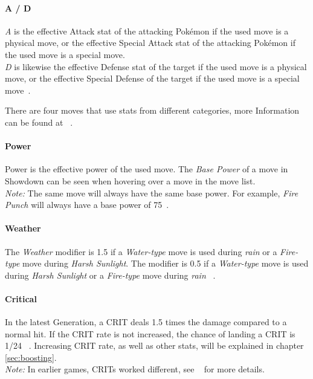 \paragraph{A / D}
\textit{A} is the effective Attack stat of the attacking Pokémon if the used move is a physical move,
or the effective Special Attack stat of the attacking Pokémon if the used move is a special move.
\\
\textit{D} is likewise the effective Defense stat of the target if the used move is a physical move,
or the effective Special Defense of the target if the used move is a special move~\autocite{Bulbapedia:Damage}.

There are four moves that use stats from different categories, more Information can be found
at ~\autocite{Bulbapedia:MoveStatDifferentCategories}.

\paragraph{Power}
Power is the effective power of the used move.
The \textit{Base Power} of a move in Showdown can be seen when hovering over a move in the move list. \\
\textit{Note:} The same move will always have the same base power. For example, \textit{Fire Punch} will
always have a base power of 75~\autocite{Bulbapedia:FirePunch}.

\paragraph{Weather}
The \textit{Weather} modifier is 1.5 if a \textit{Water-type} move is used during \textit{rain} or a 
\textit{Fire-type} move during \textit{Harsh Sunlight}. The modifier is 0.5 if a \textit{Water-type} move
is used during \textit{Harsh Sunlight} or a \textit{Fire-type} move during \textit{rain} ~\autocite{Bulbapedia:Damage}.

\paragraph{Critical}
In the latest Generation, a \ac{CRIT} deals 1.5 times the damage compared to a normal hit.
If the \ac{CRIT} rate is not increased, the chance of landing a \ac{CRIT} is 1/24
~\autocite{Bulbapedia:CriticalHit}. Increasing \ac{CRIT} rate, as well as other stats, will 
be explained in chapter \ref{sec:boosting}. \\
\textit{Note:} In earlier games, \ac{CRIT}s worked different, see ~\autocite{Bulbapedia:CriticalHit} for
more details.

